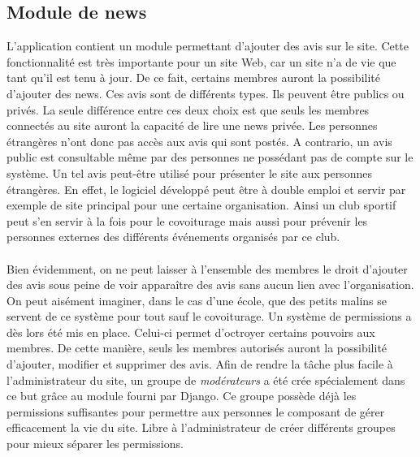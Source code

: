 \documentclass[12pt, a4paper, oneside]{article}
\begin{document}
\subsection{Module de news}\label{news}
    L'application contient un module permettant d'ajouter des avis sur le site. Cette fonctionnalité est très importante pour un site Web, car un site n'a de vie que tant qu'il est tenu à jour. De ce fait, certains membres auront la possibilité d'ajouter des news. Ces avis sont de différents types. Ils peuvent être publics ou privés. La seule différence entre ces deux choix est que seuls les membres connectés au site auront la capacité de lire une news privée. Les personnes étrangères n'ont donc pas accès aux avis qui sont postés. A contrario, un avis public est consultable même par des personnes ne possédant pas de compte sur le système. Un tel avis peut-être utilisé pour présenter le site aux personnes étrangères. En effet, le logiciel développé peut être à double emploi et servir par exemple de site principal pour une certaine organisation. Ainsi un club sportif peut s'en servir à la fois pour le covoiturage mais aussi pour prévenir les personnes externes des différents événements organisés par ce club.\\\\
    \indent Bien évidemment, on ne peut laisser à l'ensemble des membres le droit d'ajouter des avis sous peine de voir apparaître des avis sans aucun lien avec l'organisation. On peut aisément imaginer, dans le cas d'une école, que des petits malins se servent de ce système pour tout sauf le covoiturage. Un système de permissions a dès lors été mis en place. Celui-ci permet d'octroyer certains pouvoirs aux membres. De cette manière, seuls les membres autorisés auront la possibilité d'ajouter, modifier et supprimer des avis. Afin de rendre la tâche plus facile à l'administrateur du site, un groupe de \textit{modérateurs} a été crée spécialement dans ce but grâce au module fourni par Django. Ce groupe possède déjà les permissions suffisantes pour permettre aux personnes le composant de gérer efficacement la vie du site. Libre à l'administrateur de créer différents groupes pour mieux séparer les permissions.\\\\
\end{document}

